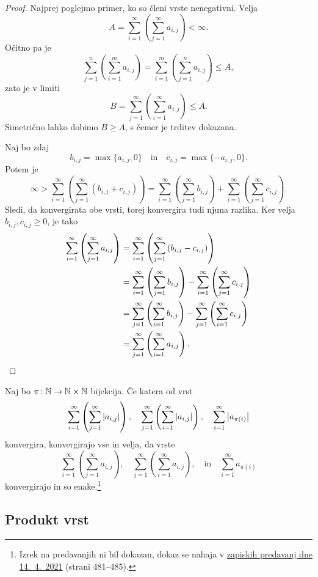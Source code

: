 \documentclass[12pt, a4paper]{article}
\begin{document}
\begin{proof}
Najprej poglejmo primer, ko so členi vrste nenegativni. Velja
\[
A=\sum_{i=1}^\infty\left(\sum_{j=1}^\infty a_{i,j}\right)<\infty.
\]
Očitno pa je
\[
\sum_{j=1}^n\left(\sum_{i=1}^m a_{i,j}\right)=\sum_{i=1}^m\left(\sum_{j=1}^n a_{i,j}\right)\leq A,
\]
zato je v limiti
\[
B=\sum_{j=1}^\infty\left(\sum_{i=1}^\infty a_{i,j}\right)\leq A.
\]
Simetrično lahko dobimo $B\geq A$, s čemer je trditev dokazana.

Naj bo zdaj
\[
b_{i,j}=\max\{a_{i,j},0\}\quad\text{in}\quad c_{i,j}=\max\{-a_{i,j},0\}.
\]
Potem je
\[
\infty>\sum_{i=1}^\infty\left(\sum_{j=1}^\infty \left(b_{i,j}+c_{i,j}\right)\right)=\sum_{i=1}^\infty\left(\sum_{j=1}^\infty b_{i,j}\right)+\sum_{i=1}^\infty\left(\sum_{j=1}^\infty c_{i,j}\right).
\]
Sledi, da konvergirata obe vrsti, torej konvergira tudi njuna razlika. Ker velja $b_{i,j},c_{i,j}\geq 0$, je tako
\begin{align*}
\sum_{i=1}^\infty\left(\sum_{j=1}^\infty a_{i,j}\right)&=\sum_{i=1}^\infty\left(\sum_{j=1}^\infty \left(b_{i,j}-c_{i,j}\right)\right)
\\
&=\sum_{i=1}^\infty\left(\sum_{j=1}^\infty b_{i,j}\right)-\sum_{i=1}^\infty\left(\sum_{j=1}^\infty c_{i,j}\right)
\\
&=\sum_{j=1}^\infty\left(\sum_{i=1}^\infty b_{i,j}\right)-\sum_{j=1}^\infty\left(\sum_{i=1}^\infty c_{i,j}\right)
\\
&=\sum_{j=1}^\infty\left(\sum_{i=1}^\infty a_{i,j}\right).\qedhere
\end{align*}
\end{proof}

\begin{izrek}
Naj bo $\pi\colon\mathbb{N}\to\mathbb{N}\times\mathbb{N}$ bijekcija. Če katera od vrst
\[
\sum_{i=1}^\infty\left(\sum_{j=1}^\infty\left\lvert a_{i,j}\right\rvert\right),\quad \sum_{j=1}^\infty\left(\sum_{i=1}^\infty\left\lvert a_{i,j}\right\rvert\right),\quad\sum_{i=1}^\infty \left\lvert a_{\pi(i)}\right\rvert
\]
konvergira, konvergirajo vse in velja, da vrste
\[
\sum_{i=1}^\infty\left(\sum_{j=1}^\infty a_{i,j}\right),\quad \sum_{j=1}^\infty\left(\sum_{i=1}^\infty a_{i,j}\right),\quad\text{in}\quad\sum_{i=1}^\infty a_{\pi(i)}
\]
konvergirajo in so enake.\footnote{Izrek na predavanjih ni bil dokazan, dokaz se nahaja v \href{https://ucilnica.fmf.uni-lj.si/pluginfile.php/95794/mod_folder/content/0/Ana1-predavanje48.pdf?forcedownload=1}{zapiskih predavanj dne 14.~4.~2021} (strani 481--485).}
\end{izrek}

\newpage

\subsection{Produkt vrst}
\end{document}
